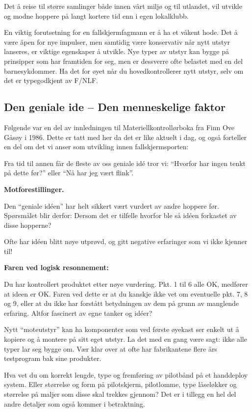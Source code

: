 Det å reise til større samlinger både innen vårt miljø og til utlandet, vil utvikle og modne hoppere på langt kortere tid enn i egen lokalklubb.

En viktig forutsetning for en fallskjermfagmann er å ha et våkent hode. Det å være åpen for nye impulser, men samtidig være konservativ når nytt utstyr lanseres, er viktige egenskaper å utvikle. Nye typer av utstyr kan bygge på prinsipper som har framtiden for seg, men er dessverre ofte belastet med en del barnesykdommer. Ha det for øyet når du hovedkontrollerer nytt utstyr, selv om det er typegodkjent av F/NLF.

\subsection{Den geniale ide – Den menneskelige faktor}
Følgende var en del av innledningen til Materiellkontrollørboka fra Finn Ove Gåsøy i 1986. Dette er tatt med her da det er like aktuelt i dag, og også forteller en del om det vi anser som utvikling innen fallskjermsporten:

Fra tid til annen får de fleste av oss geniale idé tror vi: ``Hvorfor har ingen tenkt på dette før?'' eller ``Nå har jeg vært flink''.

\textbf{Motforestillinger.}

Den ``geniale idéen'' har helt sikkert vært vurdert av andre hoppere før. Spørsmålet blir derfor: Dersom det er tilfelle hvorfor ble så idéen forkastet av disse hopperne?

Ofte har idéen blitt nøye utprøvd, og gitt negative erfaringer som vi ikke kjenner til!

\textbf{Faren ved logisk resonnement:}

Du har kontrollert produktet etter nøye vurdering. Pkt. 1 til 6 alle OK, medfører at ideen er OK. Faren ved dette er at du kanskje ikke vet om eventuelle pkt. 7, 8 og 9, eller at du ikke har forstått betydningen av dem på grunn av manglende erfaring. Altfor fascinert av egne tanker og idéer?

Nytt ``moteutstyr'' kan ha komponenter som ved første øyekast ser enkelt ut å kopiere og å montere på sitt eget utstyr. La det med en gang være sagt: ikke alle typer lar seg bygge om. Vær klar over at ofte har fabrikantene flere års testprogram bak sine produkter.

Hva vet du om korrekt lengde, type og fremføring av pilotbånd på et handdeploy system. Eller størrelse og form på pilotskjerm, pilotlomme, type låseløkker og størrelse på maljer som disse skal trekkes gjennom? Det er i tillegg en hel del andre detaljer som også kommer i betraktning.

